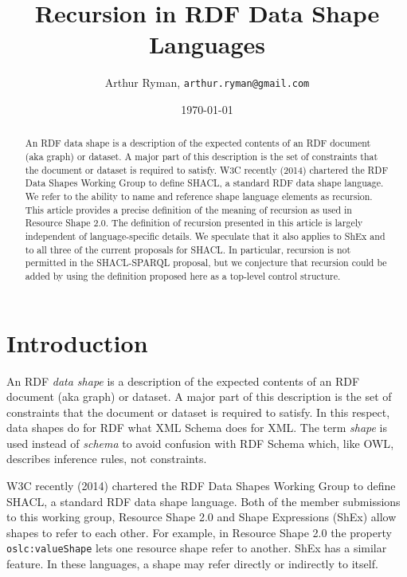 \documentclass{article}
\title{Recursion in RDF Data Shape Languages}
\author{Arthur Ryman, {\tt arthur.ryman@gmail.com}}
\date{\today}
\begin{document}

\nochangebars

\maketitle

\begin{abstract}
An RDF data shape is a description of the expected contents of an RDF document (aka graph) or dataset.
A major part of this description is the set of constraints that the document or dataset is required to satisfy.
W3C recently (2014) chartered the RDF Data Shapes Working Group to define SHACL, a standard RDF data shape language.
We refer to the ability to name and reference shape language elements as recursion.
This article provides a precise definition of the meaning of recursion as used in Resource Shape 2.0.
The definition of recursion presented in this article is largely independent of language-specific details.
We speculate that it also applies to ShEx and to all three of the current proposals for SHACL.
In particular, recursion is not permitted in the SHACL-SPARQL proposal, but we conjecture
that recursion could be added by using the definition proposed here as a top-level control structure.
\end{abstract}

\section{Introduction}
\label{sec-intro}
An RDF {\em data shape} is a description of the expected contents of an RDF document (aka graph) or dataset.
A major part of this description is the set of constraints that the document or dataset is required to satisfy.
In this respect, data shapes do for RDF what XML Schema\cite{w3c:xsd11} does for XML.
The term {\em shape} is used instead of {\em schema} to avoid confusion with RDF Schema\cite{w3c:rdfs11} which, like OWL\cite{w3c:owl2},
describes inference rules, not constraints.

W3C recently (2014) chartered the RDF Data Shapes Working Group to define SHACL, a standard RDF data shape language\cite{w3c:shapeswg}.
Both of the member submissions to this working group, Resource Shape 2.0\cite{arthur:rs} and 
Shape Expressions (ShEx) \cite{harold:shex-def} allow shapes to refer to each other.
For example, in Resource Shape 2.0 the property {\tt oslc:valueShape} lets one resource shape refer to another.
ShEx has a similar feature. In these languages, a shape may refer directly or indirectly to itself.
\end{document}
